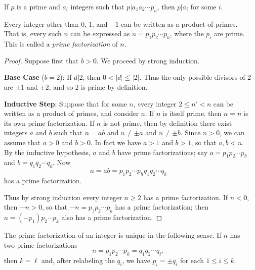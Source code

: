 \begin{cor}
If \(p\) is a prime and \(a_i\) integers such that \(p|a_1a_2 \cdots p_n\), then \(p|a_i\) for some \(i\).
\end{cor}



\begin{thm}
Every integer other than \(0\), \(1\), and \(-1\) can be written as a product of primes.
That is, every such \(n\) can be expressed as \(n = p_1p_2 \cdots p_k\), where the \(p_i\) are prime.
This is called a \emph{prime factorization} of \(n\).
\end{thm}

\begin{proof}
Suppose first that \(b > 0\).
We proceed by strong induction.
\begin{proplist}
\item \textbf{Base Case} (\(b = 2\)): If \(d|2\), then \(0 < |d| \leq |2|\).
Thus the only possible divisors of 2 are \(\pm 1\) and \(\pm 2\), and so 2 is prime by definition.
\item \textbf{Inductive Step}: Suppose that for some \(n\), every integer \(2 \leq n' < n\) can be written as a product of primes, and consider \(n\).
If \(n\) is itself prime, then \(n = n\) is its own prime factorization.
If \(n\) is not prime, then by definition there exist integers \(a\) and \(b\) such that \(n = ab\) and \(n \neq \pm a\) and \(n \neq \pm b\).
Since \(n > 0\), we can assume that \(a > 0\) and \(b > 0\).
In fact we have \(a > 1\) and \(b > 1\), so that \(a,b < n\).
By the inductive hypothesis, \(a\) and \(b\) have prime factorizations; say \(a = p_1p_2 \cdots p_h\) and \(b = q_1q_2 \cdots q_k\).
Now \[ n = ab = p_1p_2 \cdots p_h q_1q_2 \cdots q_k \] has a prime factorization.
\end{proplist}
Thus by strong induction every integer \(n \geq 2\) has a prime factorization.
If \(n < 0\), then \(-n > 0\), so that \(-n = p_1p_2 \cdots p_k\) has a prime factorization; then \(n = (-p_1)p_2 \cdots p_k\) also has a prime factorization.
\end{proof}

\begin{thm}
The prime factorization of an integer is unique in the following sense.
If \(n\) has two prime factorizations \[ n = p_1p_2 \cdots p_k = q_1q_2 \cdots q_\ell, \] then \(k = \ell\) and, after relabeling the \(q_i\), we have \(p_i = \pm q_i\) for each \(1 \leq i \leq k\).
\end{thm}

